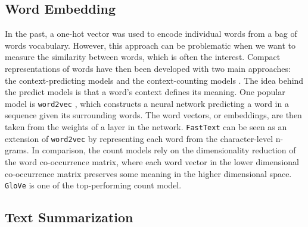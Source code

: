 \subsection{Word Embedding}
In the past, a one-hot vector was used to encode individual words from a bag of words vocabulary. However, this approach can be problematic when we want to measure the similarity between words, which is often the interest. Compact representations of words have then been developed with two main approaches: the context-predicting models and the context-counting models \cite{baroni2014don}. The idea behind the predict models is that a word's context defines its meaning. One popular model is \texttt{word2vec} \cite{mikolov2013efficient}, which constructs a neural network predicting a word in a sequence given its surrounding words. The word vectors, or embeddings, are then taken from the weights of a layer in the network. \texttt{FastText} \cite{bojanowski2017enriching} can be seen as an extension of \texttt{word2vec} by representing each word from the character-level n-grams. In comparison, the count models rely on the dimensionality reduction of the word co-occurrence matrix, where each word vector in the lower dimensional co-occurrence matrix preserves some meaning in the higher dimensional space. \texttt{GloVe} \cite{pennington2014glove} is one of the top-performing count model.

\subsection{Text Summarization}




